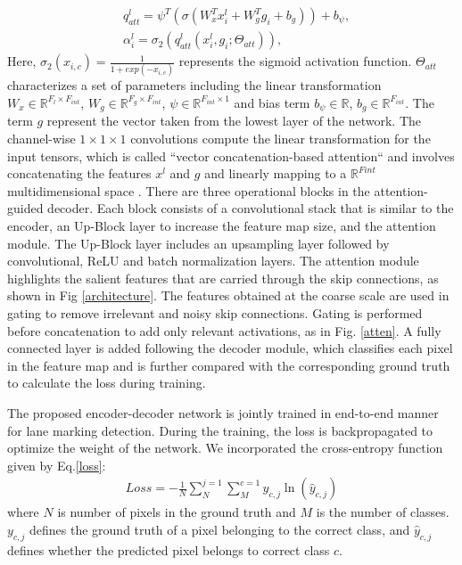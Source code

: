 \documentclass[journal]{IEEEtran}
\begin{document}
\begin{equation}
\begin{aligned}
 & q^l_{att}=\psi^T (\sigma (W^T_xx^l_i+W^T_gg_i+b_g))+b_\psi, \\
 & \alpha ^l_i=\sigma _2(q^l_{att}(x^l_i,g_i;\Theta_{att} )), 
 \label{5}
\end{aligned}
\end{equation}
Here, $\sigma _2(x_{i,c})=\frac{1}{1+exp(-x_{i,c})}$ represents the sigmoid activation function. $\Theta_{att} $ characterizes a set of parameters including the linear transformation $W_x \in \mathbb{R}^{F_l \times F_{int}}$, $W_g \in \mathbb{R}^{F_g \times F_{int}}$, $\psi  \in \mathbb{R}^{F_{int} \times 1}$ and bias term $b_\psi \in \mathbb{R}$, $b_g \in \mathbb{R}^{F_{int}}$.  The term $g$ represent the vector taken from the lowest layer of the network. The channel-wise $1 \times 1 \times 1$ convolutions compute the linear transformation for the input tensors, which is called ``vector concatenation-based attention`` and involves concatenating the features $x^l$ and $g$ and linearly mapping to a $\mathbb{R}^{F{int}}$ multidimensional space \cite{a6}. There are three operational blocks in the attention-guided decoder. Each block consists of a convolutional stack that is similar to the encoder, an Up-Block layer to increase the feature map size, and the attention module. The Up-Block layer includes an upsampling layer followed by convolutional, ReLU and batch normalization layers. The attention module highlights the salient features that are carried through the skip connections, as shown in Fig \ref{architecture}. The features obtained at the coarse scale are used in gating to remove irrelevant and noisy skip connections. 
Gating is performed 
before concatenation to add only relevant activations, as in Fig. \ref{atten}. A fully connected layer is added following the decoder module, which classifies each pixel in the feature map and is further compared with the corresponding ground truth to calculate the loss during training.
\par 
 The proposed encoder-decoder network is jointly trained in end-to-end manner for lane marking detection. During the training, the loss is backpropagated to optimize the weight of the network. We incorporated the cross-entropy function given by  Eq.\ref{loss}:
\begin{equation}
\begin{aligned}
Loss=-\frac{1}{N}\sum_{N}^{j=1}\sum_{M}^{c=1}y_{c,j} \ln (\hat{y}_{c,j})
 \label{loss}
\end{aligned}
\end{equation}
where $N$ is number of pixels in the ground truth and $M$ is the number of classes. $y_{c,j}$ defines the ground truth of a pixel belonging to the correct class, and $\hat{y}_{c,j}$ defines whether the predicted pixel belongs to correct class $c$. 
\end{document}
